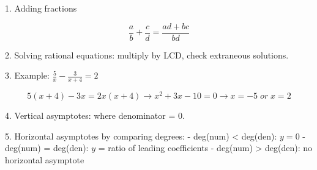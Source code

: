 1. Adding fractions

$$ \frac{a}{b}+\frac{c}{d} = \frac{ad+bc}{bd} $$

2. Solving rational equations: multiply by LCD, check extraneous solutions.

3. Example: $\frac{5}{x} - \frac{3}{x+4} = 2$

$$ 5(x+4)-3x = 2x(x+4) \rightarrow x^2+3x-10=0 \rightarrow x=-5 \; or \; x=2 $$

4. Vertical asymptotes: where denominator = 0.

5. Horizontal asymptotes by comparing degrees:
- deg(num) < deg(den): $y = 0$
- deg(num) = deg(den): $y$ = ratio of leading coefficients
- deg(num) > deg(den): no horizontal asymptote
